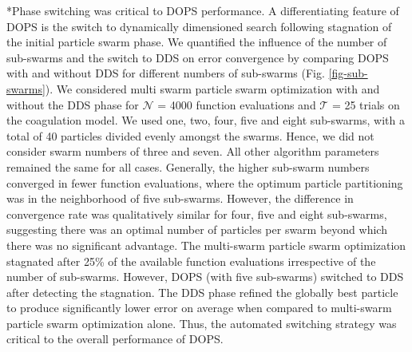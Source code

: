 \documentclass[12pt]{article}
\makeatletter
\renewcommand\subsection{\@startsection
	{subsection}{2}{0mm}
	{-0.05in}
	{-0.5\baselineskip}
	{\normalfont\normalsize\bfseries}}
\makeatother
\begin{document}
\subsection*{Phase switching was critical to DOPS performance.}
A differentiating feature of DOPS is the switch to dynamically dimensioned search following stagnation of the initial particle swarm phase.
We quantified the influence of the number of sub-swarms and the switch to DDS on error convergence by comparing DOPS with and without DDS for different numbers of sub-swarms (Fig. \ref{fig-sub-swarms}).
We considered multi swarm particle swarm optimization with and without the DDS phase for $\mathcal{N}$ = 4000 function evaluations and $\mathcal{T}$ = 25 trials on the coagulation model.
We used one, two, four, five and eight sub-swarms, with a total of 40 particles divided evenly amongst the swarms.
Hence, we did not consider swarm numbers of three and seven.
All other algorithm parameters remained the same for all cases.
Generally, the higher sub-swarm numbers converged in fewer function evaluations, where the optimum particle partitioning was in the neighborhood of five sub-swarms.
However, the difference in convergence rate was qualitatively similar for four, five and eight sub-swarms, suggesting there was an optimal number of particles per swarm beyond
which there was no significant advantage.
The multi-swarm particle swarm optimization stagnated after 25\% of the available function evaluations irrespective of the number of sub-swarms.
However, DOPS (with five sub-swarms) switched to DDS after detecting the stagnation.
The DDS phase refined the globally best particle to produce significantly lower error on average when compared to multi-swarm particle swarm optimization alone.
Thus, the automated switching strategy was critical to the overall performance of DOPS.

\clearpage

%
\end{document}

